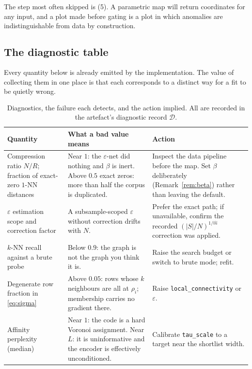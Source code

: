 \documentclass[12pt]{iopart}
\theoremstyle{definition}
\theoremstyle{plain}
\theoremstyle{remark}
\newcommand{\abs}[1]{\left\lvert#1\right\rvert}
\newcommand{\code}[1]{\texttt{#1}}
\begin{document}
The step most often skipped is (5). A parametric map will return coordinates
for any input, and a plot made before gating is a plot in which anomalies are
indistinguishable from data by construction.

\subsection{The diagnostic table}
\label{sec:diagnostics}

Every quantity below is already emitted by the implementation. The value of
collecting them in one place is that each corresponds to a distinct way for a
fit to be quietly wrong.

\begin{table}[htbp]
\centering
\footnotesize
\caption{Diagnostics, the failure each detects, and the action implied. All are
recorded in the artefact's diagnostic record $\mathcal{D}$.}
\label{tab:diagnostics}
\begin{tabular}{p{}p{}p{}}
\toprule
Quantity & What a bad value means & Action \\
\midrule
Compression ratio $N/R$; fraction of exact-zero $1$-NN distances
& Near $1$: the $\varepsilon$-net did nothing and $\beta$ is inert. Above
$0.5$ exact zeros: more than half the corpus is duplicated.
& Inspect the data pipeline before the map. Set $\beta$ deliberately
(Remark~\ref{rem:beta}) rather than leaving the default. \\[2pt]

$\varepsilon$ estimation scope and correction factor
& A subsample-scoped $\varepsilon$ without correction drifts with $N$.
& Prefer the exact path; if unavailable, confirm the recorded
$(\abs{S}/N)^{1/\hat m}$ correction was applied. \\[2pt]

$k$-NN recall against a brute probe
& Below $0.9$: the graph is not the graph you think it is.
& Raise the search budget or switch to brute mode; refit. \\[2pt]

Degenerate row fraction in \eqref{eq:sigma}
& Above $0.05$: rows whose $k$ neighbours are all at $\rho_i$; membership
carries no gradient there.
& Raise \code{local\_connectivity} or $\varepsilon$. \\[2pt]

Affinity perplexity (median)
& Near $1$: the code is a hard Voronoi assignment. Near $L$: it is
uninformative and the encoder is effectively unconditioned.
& Calibrate \code{tau\_scale} to a target near the shortlist width. \\[2pt]


\end{tabular}
\end{table}
\end{document}
